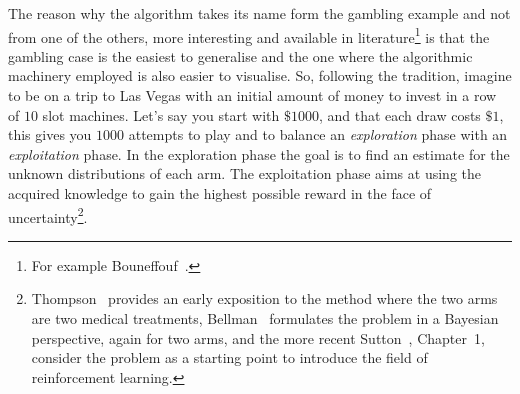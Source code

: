 \documentclass[]{scrartcl}
\theoremstyle{definition}
\begin{document}
The reason why the algorithm takes its name form the gambling example and not from one of the others, more interesting and available in literature\footnote{
    For example Bouneffouf~\cite{bf2019survey}.
    }
is that the gambling case is the easiest to generalise and the one where the algorithmic machinery employed is also easier to visualise.
So, following the tradition, imagine to be on a trip to Las Vegas with an initial amount of money to invest in a row of $10$ slot machines. Let's say you start with $\$1000$, and that each draw costs $\$1$, this gives you $1000$ attempts to play and to balance an \emph{exploration} phase with an \emph{exploitation} phase. In the exploration phase the goal is to find an estimate for the unknown distributions of each arm. The exploitation phase aims at using the acquired knowledge to gain the highest possible reward in the face of uncertainty\footnote{
    Thompson~\cite{thompson1933likelihood} provides an early exposition to the method where the two arms are two medical treatments, Bellman~\cite{bellman1956problem} formulates the problem in a Bayesian perspective, again for two arms, and the more recent Sutton~\cite{sutton2018reinforcement}, Chapter~1, consider the problem as a starting point to introduce the field of reinforcement learning.
}.
\end{document}
